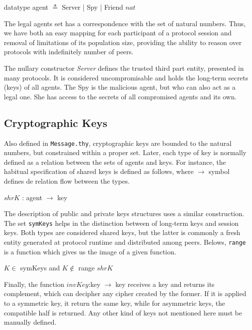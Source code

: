 \begin{center}
  {\ttfamily datatype agent $\triangleq$ Server | Spy | Friend $nat$}
\end{center}

The legal agents set has a correspondence with the set of natural numbers. Thus, we have both an easy mapping for each participant of a protocol session and removal of limitations of its population size, providing the ability to reason over protocols with indefinitely number of peers.

The nullary constructor \textit{Server} defines the trusted third part entity, presented in many protocols. It is considered uncompromisable and holds the long-term secrets (keys) of all agents. The Spy is the malicious agent, but who can also act as a legal one. She has access to the secrets of all compromised agents and its own.



\subsection{Cryptographic Keys}
Also defined in \texttt{Message.thy}, cryptographic keys are bounded to the natural numbers, but constrained within a proper set. Later, each type of key is normally defined as a relation between the sets of agents and keys. For instance, the habitual specification of shared keys is defined as follows, where $\rightarrow$ symbol defines de relation flow between the types.

\begin{center}
  {\ttfamily $shrK$ : agent $\rightarrow$ key}
\end{center}

The description of public and private keys structures uses a similar construction. The set \texttt{symKeys} helps in the distinction between of long-term keys and session keys. Both types are considered shared keys, but the latter is commonly a fresh entity generated at protocol runtime and distributed among peers. Belows, \texttt{range} is a function which gives us the image of a given function.

\begin{center}
  {\ttfamily $K \in$ symKeys} and {\ttfamily $K \notin$ range $shrK$}
\end{center}

Finally, the function {\ttfamily $invKey$:key $\longrightarrow$ key} receives a key and returns its complement, which can decipher any cipher created by the former. If it is applied to a symmetric key, it return the same key, while for asymmetric keys, the compatible half is returned. Any other kind of keys not mentioned here must be manually defined.



